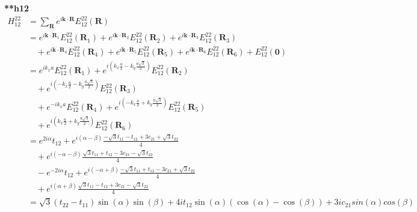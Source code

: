 \documentclass{report}
\begin{document}
\textbf{**h12}
\begin{align*}
    H^{22}_{12} & = \sum_{\mathbf{R}} e^{i \mathbf{k} \cdot \mathbf{R}} E^{22}_{12}(\mathbf{R})                             \\
                & = e^{i \mathbf{k} \cdot \mathbf{R}_1} E^{22}_{12}(\mathbf{R}_1)
    + e^{i \mathbf{k} \cdot \mathbf{R}_2} E^{22}_{12}(\mathbf{R}_2)
    + e^{i \mathbf{k} \cdot \mathbf{R}_3} E^{22}_{12}(\mathbf{R}_3)                                                         \\
                & \quad + e^{i \mathbf{k} \cdot \mathbf{R}_4} E^{22}_{12}(\mathbf{R}_4)
    + e^{i \mathbf{k} \cdot \mathbf{R}_5} E^{22}_{12}(\mathbf{R}_5)
    + e^{i \mathbf{k} \cdot \mathbf{R}_6} E^{22}_{12}(\mathbf{R}_6)
    + E^{22}_{12}(\mathbf{0})                                                                                               \\
                & = e^{i k_x a} E^{22}_{12}(\mathbf{R}_1)
    + e^{i \left( k_x \frac{a}{2} - k_y \frac{a\sqrt{3}}{2} \right)} E^{22}_{12}(\mathbf{R}_2)                              \\
                & \quad + e^{i \left( -k_x \frac{a}{2} - k_y \frac{a\sqrt{3}}{2} \right)} E^{22}_{12}(\mathbf{R}_3)         \\
                & \quad + e^{-i k_x a } E^{22}_{12}(\mathbf{R}_4)
    + e^{i \left( -k_x \frac{a}{2} + k_y \frac{a\sqrt{3}}{2} \right)} E^{22}_{12}(\mathbf{R}_5)                             \\
                & \quad + e^{i \left( k_x \frac{a}{2} + k_y \frac{a\sqrt{3}}{2} \right)} E^{22}_{12}(\mathbf{R}_6)          \\
                & = e^{2i\alpha} t_{12}
    + e^{i \left( \alpha - \beta \right)} \frac{-\sqrt{3}t_{11} - t_{12} + 3c_{21} + \sqrt{3}t_{22}}{4}                     \\
                & \quad + e^{i \left( -\alpha - \beta \right)} \frac{\sqrt{3}t_{11} + t_{12} - 3c_{21} - \sqrt{3}t_{22}}{4} \\
                & \quad - e^{-2i\alpha} t_{12}
    + e^{i \left( -\alpha + \beta \right)} \frac{-\sqrt{3}t_{11} + t_{12} - 3c_{21} + \sqrt{3}t_{22}}{4}                    \\
                & \quad + e^{i \left( \alpha + \beta \right)} \frac{\sqrt{3}t_{11} - t_{12} + 3c_{21} - \sqrt{3}t_{22}}{4}  \\
                & = \sqrt{3}(t_{22} - t_{11}) \sin(\alpha) \sin(\beta)
    + 4i t_{12} \sin(\alpha) (\cos(\alpha) - \cos(\beta)) + 3i c_{21} sin(\alpha)cos(\beta)
\end{align*}
\end{document}
